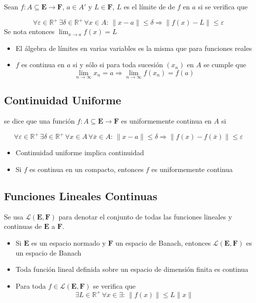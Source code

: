 Sean $f:A\subseteq\mathbf{E}\to\mathbf{F}$, $a \in A'$ y $L\in\mathbf{F}$, $L$ es el límite de de $f$ en $a$ si se verifica que

\[\forall\varepsilon\in\mathbb{R}^+\,\exists\delta\in
\mathbb{R}^+\,\forall x\in A:\, \|x-a\|\leq\delta\Rightarrow
\|f(x)-L\|\leq \varepsilon\]
\bigbreak
Se nota entonces $\lim_{x\to a}f(x)=L$

\begin{itemize}
    \item El álgebra de límites en varias variables es la misma que para funciones reales
    \item $f$ es continua en $a$ si y sólo si para toda sucesión $(x_n)$ en $A$ se cumple que
    \[\lim_{n\to\infty}x_n=a\Rightarrow\lim_{n\to\infty}
    f(x_n)=f(a)\]
\end{itemize}

\subsection{Continuidad Uniforme}

se dice que una función $f:A\subseteq\mathbf{E}\to\mathbf{F}$ es uniformemente continua en $A$ si

\[\forall\varepsilon\in\mathbb{R}^+\,\exists\delta\in
\mathbb{R}^+\,\forall x\in A\,\forall \bar{x}\in A:\,\|x-a\|\leq\delta\Rightarrow
\|f(x)-f(\bar{x})\|\leq \varepsilon\]
\bigbreak
\begin{itemize}
    \item Continuidad uniforme implica continuidad
    \item Si $f$ es continua en un compacto, entonces $f$ es uniformemente continua
\end{itemize}

\subsection{Funciones Lineales Continuas}

Se usa $\mathcal{L}(\mathbf{E},\mathbf{F})$ para denotar el conjunto de todas las funciones lineales y continuas de $\mathbf{E}$ a $\mathbf{F}$.

\begin{itemize}
    \item Si $\mathbf{E}$ es un espacio normado y $\mathbf{F}$ un espacio de Banach, entonces $\mathcal{L}(\mathbf{E},\mathbf{F})$ es un espacio de Banach
    \item Toda función lineal definida sobre un espacio de dimensión finita es continua
    \item Para toda $f\in\mathcal{L}(\mathbf{E},\mathbf{F})$ se verifica que
    \[\exists L\in\mathbb{R}^+\,\forall x\in\exists:\,
    \|f(x)\|\leq L\|x\|\]
\end{itemize}

